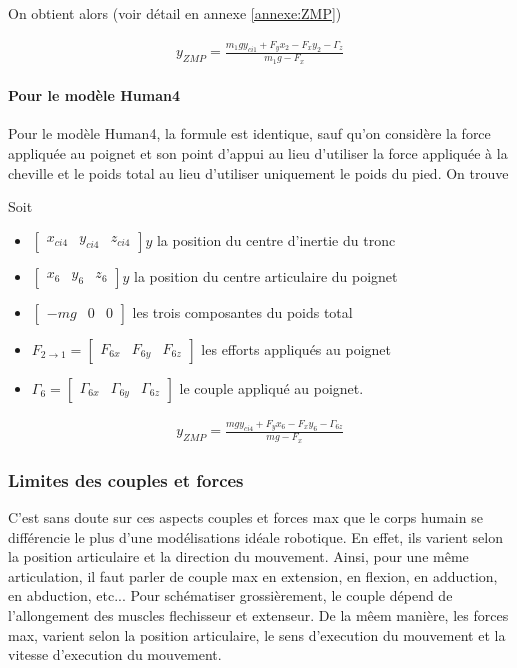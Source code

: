 \documentclass[a4paper, 10pt ]{article}
\begin{document}
On obtient alors (voir détail en annexe \ref{annexe:ZMP})

\begin{align}
y_{ZMP}=\frac{m_1gy_{ci1}+F_yx_2-F_x y_2-\Gamma_z}{m_1g-F_x}
\label{eq:ZMP}
\end{align}


\paragraph{Pour le modèle Human4} 

Pour le modèle Human4, la formule est identique, sauf qu'on considère la force appliquée au poignet et son point d'appui au lieu d'utiliser la force appliquée à la cheville et le poids total au lieu d'utiliser uniquement le poids du pied. On trouve

Soit 
\begin{itemize}
\item $\begin{bmatrix} x_{ci4} &y_{ci4}& z_{ci4}\end{bmatrix}y$ la position du centre d'inertie du tronc
\item $\begin{bmatrix} x_{6} &y_{6}& z_{6}\end{bmatrix}y$ la position du centre articulaire du poignet
\item $\begin{bmatrix} -mg &0& 0\end{bmatrix}$ les trois composantes du poids total
\item $F_{2\rightarrow1}=\begin{bmatrix} F_{6x} &F_{6y}& F_{6z}\end{bmatrix}$ les efforts appliqués au poignet
\item $\Gamma_6=\begin{bmatrix} \Gamma_{6x} &\Gamma_{6y}& \Gamma_{6z}\end{bmatrix}$ le couple appliqué au poignet.
\end{itemize}
\begin{align}
y_{ZMP}=\frac{mgy_{ci4}+F_yx_6-F_x y_6-\Gamma_{6z}}{mg-F_x}
\label{eq:ZMP}
\end{align}


\subsubsection{Limites des couples et forces}

C'est sans doute sur ces aspects couples et forces max que le corps humain se différencie le plus d'une modélisations idéale robotique. En effet, ils varient selon la position articulaire et la direction du mouvement. 
Ainsi, pour une même articulation, il faut parler de couple max en extension, en flexion, en adduction, en abduction, etc... 
Pour schématiser grossièrement, le couple dépend de l'allongement des muscles flechisseur et extenseur. De la mêem manière, les forces max, varient selon la position articulaire, le sens d'execution du mouvement et la vitesse d'execution du mouvement. \\
\end{document}
